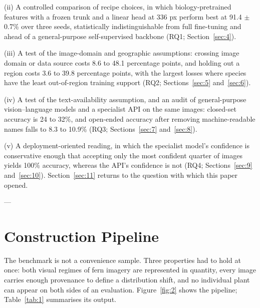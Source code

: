 \documentclass[preprint,12pt,authoryear]{elsarticle}
\begin{document}
(ii) A controlled comparison of recipe choices, in which biology-pretrained features with a frozen trunk and a linear head at 336 px perform best at 91.4 $\pm$ 0.7\% over three seeds, statistically indistinguishable from full fine-tuning and ahead of a general-purpose self-supervised backbone (RQ1; Section~\ref{sec:4}).

(iii) A test of the image-domain and geographic assumptions: crossing image domain or data source costs 8.6 to 48.1 percentage points, and holding out a region costs 3.6 to 39.8 percentage points, with the largest losses where species have the least out-of-region training support (RQ2; Sections~\ref{sec:5} and~\ref{sec:6}).

(iv) A test of the text-availability assumption, and an audit of general-purpose vision--language models and a specialist API on the same images: closed-set accuracy is 24 to 32\%, and open-ended accuracy after removing machine-readable names falls to 8.3 to 10.9\% (RQ3; Sections~\ref{sec:7} and~\ref{sec:8}).

(v) A deployment-oriented reading, in which the specialist model's confidence is conservative enough that accepting only the most confident quarter of images yields 100\% accuracy, whereas the API's confidence is not (RQ4; Sections~\ref{sec:9} and~\ref{sec:10}). Section~\ref{sec:11} returns to the question with which this paper opened.

---

\setcounter{section}{2}

\section{Construction Pipeline}\label{sec:3}

The benchmark is not a convenience sample. Three properties had to hold at once: both visual regimes of fern imagery are represented in quantity, every image carries enough provenance to define a distribution shift, and no individual plant can appear on both sides of an evaluation. Figure~\ref{fig:2} shows the pipeline; Table~\ref{tab:1} summarises its output.
\end{document}
